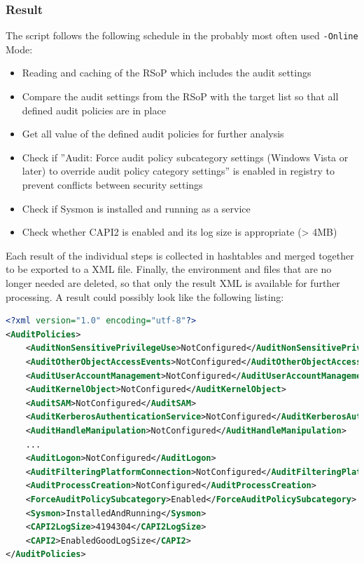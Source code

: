 \subsubsection{Result}\label{GetAndAnalyseAuditPoliciesResult}
The script follows the following schedule in the probably most often used \lstinline|-Online| Mode:
\begin{itemize}
    \item Reading and caching of the RSoP which includes the audit settings
    \item Compare the audit settings from the RSoP with the target list so that all defined audit policies are in place
    \item Get all value of the defined audit policies for further analysis
    \item Check if ''Audit: Force audit policy subcategory settings (Windows Vista or later) to override audit policy category settings'' is enabled in registry to prevent conflicts between security settings
    \item Check if Sysmon is installed and running as a service
    \item Check whether CAPI2 is enabled and its log size is appropriate (> 4MB)
\end{itemize}
Each result of the individual steps is collected in hashtables and merged together to be exported to a XML file. Finally, the environment and files that are no longer needed are deleted, so that only the result XML is available for further processing. A result could possibly look like the following listing:
\begin{lstlisting}[caption=Example Result Audit Policy Analysis, language=xml]
<?xml version="1.0" encoding="utf-8"?>
<AuditPolicies>
    <AuditNonSensitivePrivilegeUse>NotConfigured</AuditNonSensitivePrivilegeUse>
    <AuditOtherObjectAccessEvents>NotConfigured</AuditOtherObjectAccessEvents>
    <AuditUserAccountManagement>NotConfigured</AuditUserAccountManagement>
    <AuditKernelObject>NotConfigured</AuditKernelObject>
    <AuditSAM>NotConfigured</AuditSAM>
    <AuditKerberosAuthenticationService>NotConfigured</AuditKerberosAuthenticationService>
    <AuditHandleManipulation>NotConfigured</AuditHandleManipulation>
    ...    
    <AuditLogon>NotConfigured</AuditLogon>
    <AuditFilteringPlatformConnection>NotConfigured</AuditFilteringPlatformConnection>
    <AuditProcessCreation>NotConfigured</AuditProcessCreation>
    <ForceAuditPolicySubcategory>Enabled</ForceAuditPolicySubcategory>
    <Sysmon>InstalledAndRunning</Sysmon>
    <CAPI2LogSize>4194304</CAPI2LogSize>
    <CAPI2>EnabledGoodLogSize</CAPI2>
</AuditPolicies>
\end{lstlisting}

